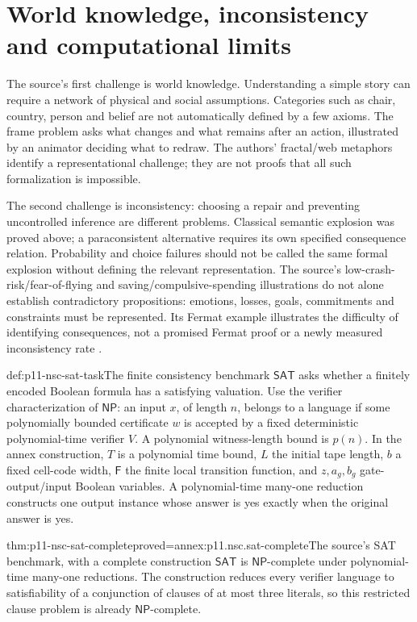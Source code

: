 \section{World knowledge, inconsistency and computational limits}
\label{sec:p11-nsc-limits}

The source's first challenge is world knowledge. Understanding a simple
story can require a network of physical and social assumptions. Categories
such as chair, country, person and belief are not automatically defined
by a few axioms. The frame problem asks what changes and what remains
after an action, illustrated by an animator deciding what to redraw.
The authors' fractal/web metaphors identify a representational challenge;
they are not proofs that all such formalization is impossible.

The second challenge is inconsistency: choosing a repair and preventing
uncontrolled inference are different problems. Classical semantic explosion
was proved above; a paraconsistent alternative requires its own specified
consequence relation. Probability and choice failures should not be called
the same formal explosion without defining the relevant representation.
The source's low-crash-risk/fear-of-flying and saving/compulsive-spending
illustrations do not alone establish contradictory propositions: emotions,
losses, goals, commitments and constraints must be represented. Its Fermat
example illustrates the difficulty of identifying consequences, not a
promised Fermat proof or a newly measured inconsistency rate
\cite[pp.~18--19]{ChaterOaksford2012NormativeSystems}.

\begin{hbdefinition}{def:p11-nsc-sat-task}{The finite consistency benchmark}
\(\mathsf{SAT}\) asks whether a finitely encoded Boolean formula has
a satisfying valuation. Use the verifier characterization of
\(\mathsf{NP}\): an input \(x\), of length \(n\), belongs to a
language if some polynomially bounded certificate \(w\) is accepted
by a fixed deterministic polynomial-time verifier \(V\).
A polynomial witness-length bound is \(p(n)\). In the annex construction,
\(T\) is a polynomial time bound, \(L\) the initial tape length,
\(b\) a fixed cell-code width, \(\mathsf F\) the finite local transition
function, and \(z,a_g,b_g\) gate-output/input Boolean variables.
A polynomial-time many-one reduction constructs one output instance
whose answer is yes exactly when the original answer is yes.
\end{hbdefinition}

\begin{hbtheorem}{thm:p11-nsc-sat-complete}{proved=annex:p11.nsc.sat-complete}{The source's SAT benchmark, with a complete construction}
\(\mathsf{SAT}\) is \(\mathsf{NP}\)-complete under polynomial-time
many-one reductions. The construction reduces every verifier language
to satisfiability of a conjunction of clauses of at most three literals,
so this restricted clause problem is already \(\mathsf{NP}\)-complete.
\end{hbtheorem}

